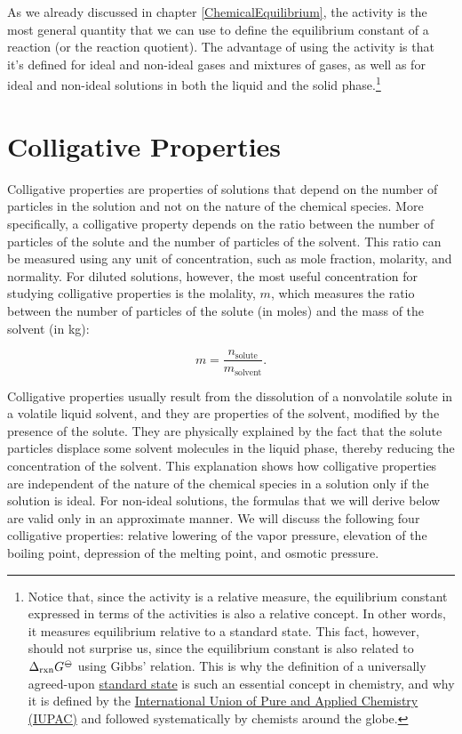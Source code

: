 \documentclass[
  9pt,
]{extbook}
\theoremstyle{definition}
\theoremstyle{definition}
\theoremstyle{definition}
\theoremstyle{remark}
\begin{document}
As we already discussed in chapter \ref{ChemicalEquilibrium}, the activity is the most general quantity that we can use to define the equilibrium constant of a reaction (or the reaction quotient). The advantage of using the activity is that it's defined for ideal and non-ideal gases and mixtures of gases, as well as for ideal and non-ideal solutions in both the liquid and the solid phase.\footnote{Notice that, since the activity is a relative measure, the equilibrium constant expressed in terms of the activities is also a relative concept. In other words, it measures equilibrium relative to a standard state. This fact, however, should not surprise us, since the equilibrium constant is also related to \(\Delta_{\text{rxn}} G^{{-\kern-6pt{\ominus}\kern-6pt-}}\) using Gibbs' relation. This is why the definition of a universally agreed-upon \href{https://en.wikipedia.org/wiki/Standard_state}{standard state} is such an essential concept in chemistry, and why it is defined by the \href{https://en.wikipedia.org/wiki/International_Union_of_Pure_and_Applied_Chemistry}{International Union of Pure and Applied Chemistry (IUPAC)} and followed systematically by chemists around the globe.}

\hypertarget{colligative-properties}{%
\section{Colligative Properties}\label{colligative-properties}}

Colligative properties are properties of solutions that depend on the number of particles in the solution and not on the nature of the chemical species. More specifically, a colligative property depends on the ratio between the number of particles of the solute and the number of particles of the solvent. This ratio can be measured using any unit of concentration, such as mole fraction, molarity, and normality. For diluted solutions, however, the most useful concentration for studying colligative properties is the molality, \(m\), which measures the ratio between the number of particles of the solute (in moles) and the mass of the solvent (in kg):

\begin{equation}
m = \frac{n_{\text{solute}}}{m_{\text{solvent}}}.
\label{eq:coll1}
\end{equation}

Colligative properties usually result from the dissolution of a nonvolatile solute in a volatile liquid solvent, and they are properties of the solvent, modified by the presence of the solute. They are physically explained by the fact that the solute particles displace some solvent molecules in the liquid phase, thereby reducing the concentration of the solvent. This explanation shows how colligative properties are independent of the nature of the chemical species in a solution only if the solution is ideal. For non-ideal solutions, the formulas that we will derive below are valid only in an approximate manner. We will discuss the following four colligative properties: relative lowering of the vapor pressure, elevation of the boiling point, depression of the melting point, and osmotic pressure.
\end{document}
